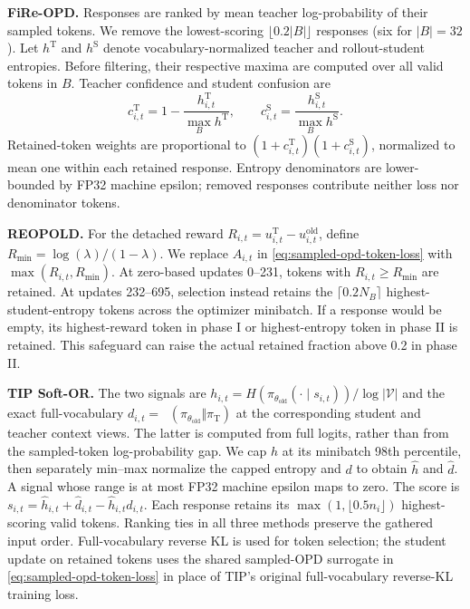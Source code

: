 \documentclass{article}
\theoremstyle{plain}
\theoremstyle{definition}
\theoremstyle{remark}
\newcommand{\Vocab}{\mathcal{V}}
\DeclareMathOperator{\KL}{D_{\mathrm{KL}}}
\begin{document}
\textbf{FiRe-OPD.}
Responses are ranked by mean teacher log-probability of their sampled tokens. We remove the lowest-scoring \(\lfloor0.2|B|\rfloor\) responses (six for \(|B|=32\)). Let \(h^{\mathrm T}\) and \(h^{\mathrm S}\) denote vocabulary-normalized teacher and rollout-student entropies. Before filtering, their respective maxima are computed over all valid tokens in \(B\). Teacher confidence and student confusion are
\[
    c^{\mathrm T}_{i,t}=1-\frac{h^{\mathrm T}_{i,t}}{\max_B h^{\mathrm T}},
    \qquad c^{\mathrm S}_{i,t}=\frac{h^{\mathrm S}_{i,t}}{\max_B h^{\mathrm S}}.
\]
Retained-token weights are proportional to \((1+c^{\mathrm T}_{i,t})(1+c^{\mathrm S}_{i,t})\), normalized to mean one within each retained response. Entropy denominators are lower-bounded by FP32 machine epsilon; removed responses contribute neither loss nor denominator tokens.

\textbf{REOPOLD.}
For the detached reward \(R_{i,t}=u^{\mathrm T}_{i,t}-u^{\mathrm{old}}_{i,t}\), define \(R_{\min}=\log(\lambda)/(1-\lambda)\). We replace \(A_{i,t}\) in \cref{eq:sampled-opd-token-loss} with \(\max(R_{i,t},R_{\min})\). At zero-based updates 0--231, tokens with \(R_{i,t}\ge R_{\min}\) are retained. At updates 232--695, selection instead retains the \(\lceil0.2N_B\rceil\) highest-student-entropy tokens across the optimizer minibatch. If a response would be empty, its highest-reward token in phase I or highest-entropy token in phase II is retained. This safeguard can raise the actual retained fraction above 0.2 in phase II.

\textbf{TIP Soft-OR.}
The two signals are \(h_{i,t}=H(\pi_{\theta_{\mathrm{old}}}(\cdot\mid s_{i,t}))/\log|\Vocab|\) and the exact full-vocabulary \(d_{i,t}=\KL(\pi_{\theta_{\mathrm{old}}}\Vert\pi_{\mathrm T})\) at the corresponding student and teacher context views. The latter is computed from full logits, rather than from the sampled-token log-probability gap. We cap \(h\) at its minibatch 98th percentile, then separately min--max normalize the capped entropy and \(d\) to obtain \(\hat h\) and \(\hat d\). A signal whose range is at most FP32 machine epsilon maps to zero. The score is \(s_{i,t}=\hat h_{i,t}+\hat d_{i,t}-\hat h_{i,t}\hat d_{i,t}\). Each response retains its \(\max(1,\lfloor0.5n_i\rfloor)\) highest-scoring valid tokens. Ranking ties in all three methods preserve the gathered input order. Full-vocabulary reverse KL is used for token selection; the student update on retained tokens uses the shared sampled-OPD surrogate in \cref{eq:sampled-opd-token-loss} in place of TIP's original full-vocabulary reverse-KL training loss.
\end{document}
